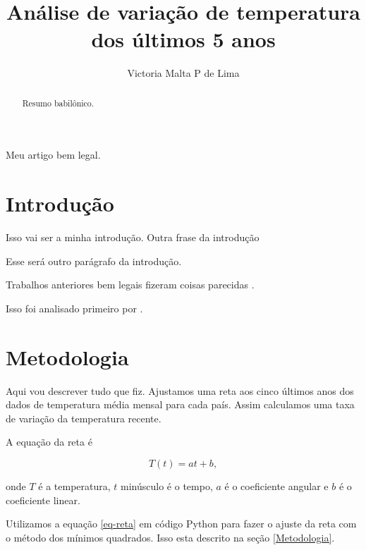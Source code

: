 \documentclass{article}
\begin{document}

\title{Análise de variação de temperatura dos últimos 5 anos}

\author{Victoria Malta P de Lima}

\maketitle

Meu artigo bem legal.

\begin{abstract}
Resumo babilônico.

\end{abstract}

\section{Introdução}

Isso vai ser a minha introdução.
Outra frase da introdução

Esse será outro parágrafo da introdução.

Trabalhos anteriores bem legais fizeram coisas parecidas 
\citep{Osman2021}.

Isso foi analisado primeiro por \citet{Osman2021}.

\section{Metodologia}

Aqui vou descrever tudo que fiz.
Ajustamos uma reta aos cinco últimos anos dos dados de temperatura média
mensal para cada país.
Assim calculamos uma taxa de variação da temperatura recente.

A equação da reta é

\begin{equation} 
T(t) = a t + b,
\label{eq-reta}
\end{equation}

\noindent %
onde $T$ é a temperatura, $t$ minúsculo é o tempo, $a$ é o coeficiente angular e $b$ é o coeficiente linear.

Utilizamos a equação \ref{eq-reta} em código Python para fazer o ajuste da 
reta com o método dos mínimos quadrados.
Isso esta descrito na seção \ref{Metodologia}.

\end{document}
